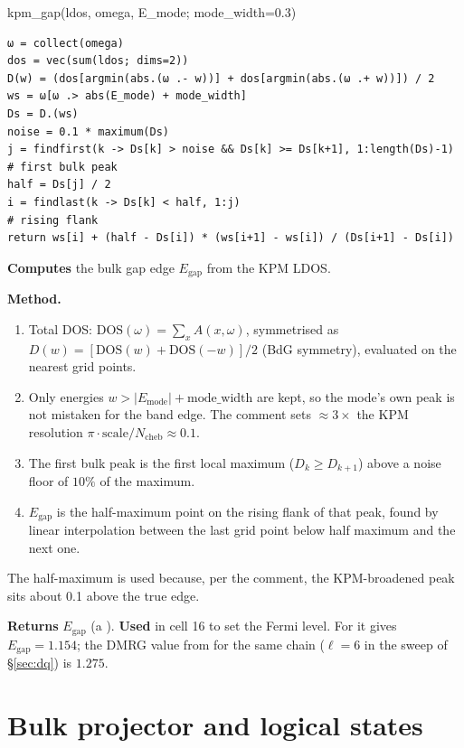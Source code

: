 \documentclass[11pt]{article}
\begin{document}
\begin{function}{kpm\_gap(ldos, omega, E\_mode; mode\_width=0.3)}
\begin{Verbatim}
ω = collect(omega)
dos = vec(sum(ldos; dims=2))
D(w) = (dos[argmin(abs.(ω .- w))] + dos[argmin(abs.(ω .+ w))]) / 2
ws = ω[ω .> abs(E_mode) + mode_width]
Ds = D.(ws)
noise = 0.1 * maximum(Ds)
j = findfirst(k -> Ds[k] > noise && Ds[k] >= Ds[k+1], 1:length(Ds)-1)     # first bulk peak
half = Ds[j] / 2
i = findlast(k -> Ds[k] < half, 1:j)                                       # rising flank
return ws[i] + (half - Ds[i]) * (ws[i+1] - ws[i]) / (Ds[i+1] - Ds[i])
\end{Verbatim}
\textbf{Computes} the bulk gap edge $E_{\text{gap}}$ from the KPM LDOS.

\textbf{Method.}
\begin{enumerate}
\item Total DOS: $\mathrm{DOS}(\omega)=\sum_x A(x,\omega)$, symmetrised as
      $D(w)=[\mathrm{DOS}(w)+\mathrm{DOS}(-w)]/2$ (BdG symmetry), evaluated on the nearest grid points.
\item Only energies $w > |E_{\text{mode}}| + \text{mode\_width}$ are kept, so the mode's own peak is not mistaken for
      the band edge. The comment sets  $\approx 3\times$ the KPM resolution
      $\pi\cdot\text{scale}/N_{\text{cheb}}\approx 0.1$.
\item The first bulk peak is the first local maximum ($D_k\ge D_{k+1}$) above a noise floor of $10\%$ of the maximum.
\item $E_{\text{gap}}$ is the half-maximum point on the rising flank of that peak, found by linear interpolation
      between the last grid point below half maximum and the next one.
\end{enumerate}
The half-maximum is used because, per the comment, the KPM-broadened peak sits about 0.1 above the true edge.

\textbf{Returns} $E_{\text{gap}}$ (a ). \textbf{Used} in cell 16 to set the Fermi level. For 
it gives $E_{\text{gap}}=1.154$; the DMRG value from  for the same chain ($\ell=6$ in the sweep of
\S\ref{sec:dq}) is $1.275$.
\end{function}

\section{Bulk projector and logical states}\label{sec:gamma}
\end{document}
